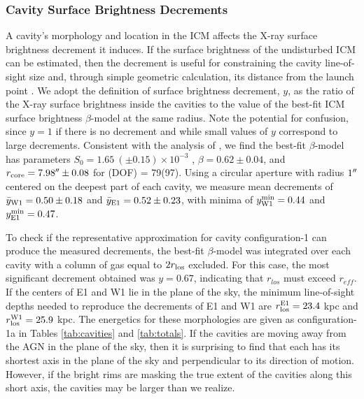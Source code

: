 \documentclass[iop]{emulateapj}
\begin{document}
\subsubsection{Cavity Surface Brightness Decrements}
\label{sec:dec}

A cavity's morphology and location in the ICM affects the X-ray
surface brightness decrement it induces. If the surface brightness of
the undisturbed ICM can be estimated, then the decrement is useful for
constraining the cavity line-of-sight size and, through simple
geometric calculation, its distance from the launch point
\citep[see][for details]{hydraa}. We adopt the \citet{hydraa}
definition of surface brightness decrement, $y$, as the ratio of the
X-ray surface brightness inside the cavities to the value of the
best-fit ICM surface brightness $\beta$-model at the same radius. Note
the potential for confusion, since $y=1$ if there is no decrement and
while small values of $y$ correspond to large decrements. Consistent
with the analysis of \citet{schindler01}, we find the best-fit
$\beta$-model has parameters $S_0 = 1.65 ~(\pm 0.15) \times 10^{-3}$
\sbr, $\beta = 0.62 \pm 0.04$, and $r_{\rm{core}} = 7.98\rm{^\prime}\hskip -0.1em\rm{^\prime} \pm
0.08$ for \chisq(DOF) = 79(97). Using a circular aperture with radius
$1\rm{^\prime}\hskip -0.1em\rm{^\prime}$ centered on the deepest part of each cavity, we measure mean
decrements of $\bar{y}_{\rm{W1}} = 0.50 \pm 0.18$ and
$\bar{y}_{\rm{E1}} = 0.52 \pm 0.23$, with minima of
$y^{\rm{min}}_{\rm{W1}} = 0.44$ and $y^{\rm{min}}_{\rm{E1}} = 0.47$.

To check if the representative approximation for cavity
configuration-1 can produce the measured decrements, the best-fit
$\beta$-model was integrated over each cavity with a column of gas
equal to $2r_{\rm{los}}$ excluded. For this case, the most significant
decrement obtained was $y = 0.67$, indicating that $r_{los}$ must
exceed $r_{eff}$. If the centers of E1 and W1 lie in the plane of the
sky, the minimum line-of-sight depths needed to reproduce the
decrements of E1 and W1 are $r_{\rm{los}}^{\rm{E1}} = 23.4$ kpc and
$r_{\rm{los}}^{\rm{W1}} = 25.9$ kpc. The energetics for these morphologies
are given as configuration-1a in Tables \ref{tab:cavities} and
\ref{tab:totals}. If the cavities are moving away from the AGN in the
plane of the sky, then it is surprising to find that each has its
shortest axis in the plane of the sky and perpendicular to its
direction of motion. However, if the bright rims are masking the true
extent of the cavities along this short axis, the cavities may be
larger than we realize.
\end{document}
